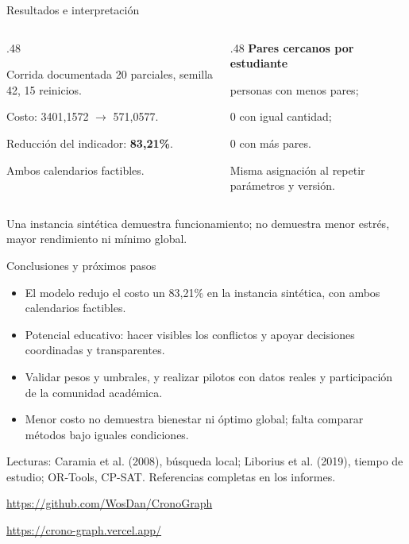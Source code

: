 \documentclass[aspectratio=169,11pt]{beamer}
\begin{document}
\begin{frame}{Resultados e interpretación}
  \begin{columns}[T,onlytextwidth]
    \begin{column}{.48\textwidth}
      \begin{block}{Corrida documentada}
        20 parciales, semilla 42, 15 reinicios.\par\medskip
        Costo: 3401,1572 $\rightarrow$ 571,0577.\par
        Reducción del indicador: \textbf{83,21\%}.\par
        Ambos calendarios factibles.
      \end{block}
    \end{column}
    \begin{column}{.48\textwidth}
      \textbf{Pares cercanos por estudiante}\par{} personas con menos pares;\par
      0 con igual cantidad;\par
      0 con más pares.\par\medskip
      Misma asignación al repetir parámetros y versión.
    \end{column}
  \end{columns}
  \vfill\small Una instancia sintética demuestra funcionamiento; no demuestra menor estrés, mayor rendimiento ni mínimo global.
\end{frame}

\begin{frame}{Conclusiones y próximos pasos}
  \begin{itemize}
    \item El modelo redujo el costo un 83,21\% en la instancia sintética, con ambos calendarios factibles.
    \item Potencial educativo: hacer visibles los conflictos y apoyar decisiones coordinadas y transparentes.
    \item Validar pesos y umbrales, y realizar pilotos con datos reales y participación de la comunidad académica.
    \item Menor costo no demuestra bienestar ni óptimo global; falta comparar métodos bajo iguales condiciones.
  \end{itemize}
  \vfill\footnotesize Lecturas: Caramia et al. (2008), búsqueda local; Liborius et al. (2019), tiempo de estudio; OR-Tools, CP-SAT. Referencias completas en los informes.\par\medskip
  \url{https://github.com/WosDan/CronoGraph}\par
  \url{https://crono-graph.vercel.app/}
\end{frame}
\end{document}
